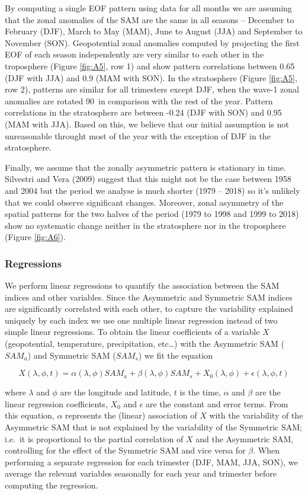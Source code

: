 \documentclass[smallextended]{svjour3}       %
\begin{document}
By computing a single EOF pattern using data for all months we are assuming that the zonal anomalies of the SAM are the same in all seasons -- December to February (DJF), March to May (MAM), June to August (JJA) and September to November (SON). Geopotential zonal anomalies computed by projecting the first EOF of each season independently are very similar to each other in the troposphere (Figure \ref{fig:A5}, row 1) and show pattern correlations between 0.65 (DJF with JJA) and 0.9 (MAM with SON). In the stratosphere (Figure \ref{fig:A5}, row 2), patterns are similar for all trimesters except DJF, when the wave-1 zonal anomalies are rotated 90\degree~in comparison with the rest of the year. Pattern correlations in the stratosphere are between -0.24 (DJF with SON) and 0.95 (MAM with JJA). Based on this, we believe that our initial assumption is not unreasonable throught most of the year with the exception of DJF in the stratosphere.

Finally, we assume that the zonally asymmetric pattern is stationary in time. Silvestri and Vera (2009) suggest that this might not be the case between 1958 and 2004 but the period we analyse is much shorter (1979 -- 2018) so it's unlikely that we could observe significant changes. Moreover, zonal asymmetry of the spatial patterns for the two halves of the period (1979 to 1998 and 1999 to 2018) show no systematic change neither in the stratosphere nor in the troposphere (Figure \ref{fig:A6}).

\hypertarget{regressions}{%
\subsubsection{Regressions}\label{regressions}}

We perform linear regressions to quantify the association between the SAM indices and other variables. Since the Asymmetric and Symmetric SAM indices are significantly correlated with each other, to capture the variability explained uniquely by each index we use one multiple linear regression instead of two simple linear regressions. To obtain the linear coefficients of a variable \(X\) (geopotential, temperature, precipitation, etc\ldots{}) with the Asymmetric SAM (\(SAM_a\)) and Symmetric SAM (\(SAM_s\)) we fit the equation

\[
X(\lambda, \phi, t) = \alpha(\lambda, \phi) SAM_a + \beta(\lambda, \phi) SAM_s + X_0(\lambda, \phi) +  \epsilon(\lambda, \phi, t)
\]

where \(\lambda\) and \(\phi\) are the longitude and latitude, \(t\) is the time, \(\alpha\) and \(\beta\) are the linear regression coefficients, \(X_0\) and \(\epsilon\) are the constant and error terms. From this equation, \(\alpha\) represents the (linear) association of \(X\) with the variability of the Asymmetric SAM that is not explained by the variability of the Symmetric SAM; i.e.~it is proportional to the partial correlation of \(X\) and the Asymmetric SAM, controlling for the effect of the Symmetric SAM and vice versa for \(\beta\). When performing a separate regression for each trimester (DJF, MAM, JJA, SON), we average the relevant variables seasonally for each year and trimester before computing the regression.
\end{document}
